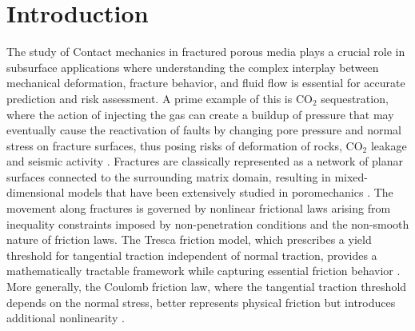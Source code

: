 \documentclass[a4paper,11pt]{article}
\newcounter{example}[section]
\theoremstyle{definition}
\theoremstyle{remark}
\begin{document}
\section{Introduction}%
The study of Contact mechanics in fractured porous media plays a crucial role in subsurface applications where understanding the complex interplay between mechanical deformation, fracture behavior, and fluid flow is essential for accurate prediction and risk assessment. A prime example of this is $\text{CO}_2$ sequestration, where the action of injecting the gas can create a buildup of pressure that may eventually cause the reactivation of faults by changing pore pressure and normal stress on fracture surfaces, thus posing risks of deformation of rocks, $\text{CO}_2$ leakage \cite{abbassifracture} and seismic activity \cite{GH19}. Fractures are classically represented as a network of planar surfaces connected to the surrounding matrix domain, resulting in mixed-dimensional models that have been extensively studied in poromechanics \cite{abbassifracture, contact-norvegiens, GDM-poromeca-cont, GDM-poromeca-disc, BDMP:21, tchelepi-castelletto-2020, GH19, GKT16, NEJATI2016123}. The movement along fractures is governed by nonlinear frictional laws arising from inequality constraints imposed by non-penetration conditions and the non-smooth nature of friction laws. The Tresca friction model, which prescribes a yield threshold for tangential traction independent of normal traction, provides a mathematically tractable framework while capturing essential friction behavior \cite{chouly2023}. More generally, the Coulomb friction law, where the tangential traction threshold depends on the normal stress, better represents physical friction but introduces additional nonlinearity \cite{CHLR2020}. 
\end{document}
